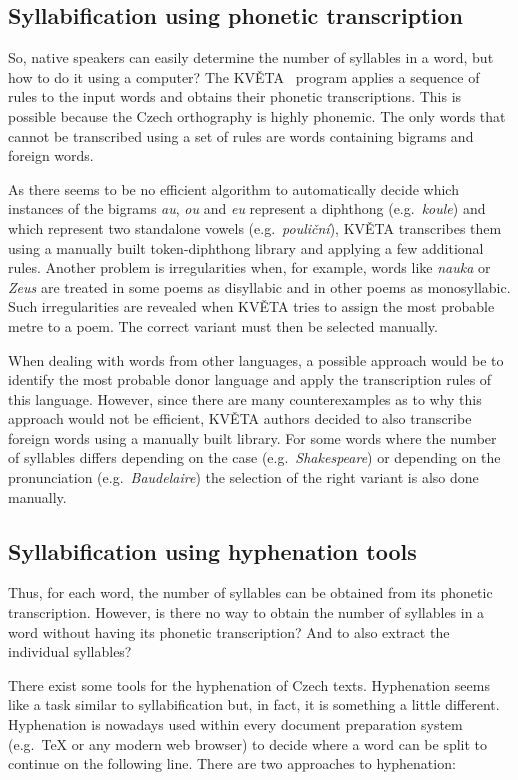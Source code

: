 \subsection{Syllabification using phonetic transcription}
So, native speakers can easily determine the number of syllables in a word, but how to do it using a computer? The KVĚTA~\cite{KVETA} program applies a sequence of rules to the input words and obtains their phonetic transcriptions. This is possible because the Czech orthography is highly phonemic. The only words that cannot be transcribed using a set of rules are words containing bigrams and foreign words.

As there seems to be no efficient algorithm to automatically decide which instances of the bigrams \emph{au}, \emph{ou} and \emph{eu} represent a diphthong (e.g.~\emph{koule}) and which represent two standalone vowels (e.g.~\emph{pouliční}), KVĚTA transcribes them using a manually built token-diphthong library and applying a few additional rules. Another problem is irregularities when, for example, words like \emph{nauka} or \emph{Zeus} are treated in some poems as disyllabic and in other poems as monosyllabic. Such irregularities are revealed when KVĚTA tries to assign the most probable metre to a poem. The correct variant must then be selected manually.

When dealing with words from other languages, a possible approach would be to identify the most probable donor language and apply the transcription rules of this language. However, since there are many counterexamples as to why this approach would not be efficient, KVĚTA authors decided to also transcribe foreign words using a manually built library. For some words where the number of syllables differs depending on the case (e.g.~\emph{Shakespeare}) or depending on the pronunciation (e.g.~\emph{Baudelaire}) the selection of the right variant is also done manually.~\cite{KVETA}

\subsection{Syllabification using hyphenation tools}
Thus, for each word, the number of syllables can be obtained from its phonetic transcription. However, is there no way to obtain the number of syllables in a word without having its phonetic transcription? And to also extract the individual syllables?~\cite{GitCorpusCzechVerse}

There exist some tools for the hyphenation of Czech texts. Hyphenation seems like a task similar to syllabification but, in fact, it is something a little different. Hyphenation is nowadays used within every document preparation system (e.g.~\TeX{} or any modern web browser) to decide where a word can be split to continue on the following line. There are two approaches to hyphenation:

